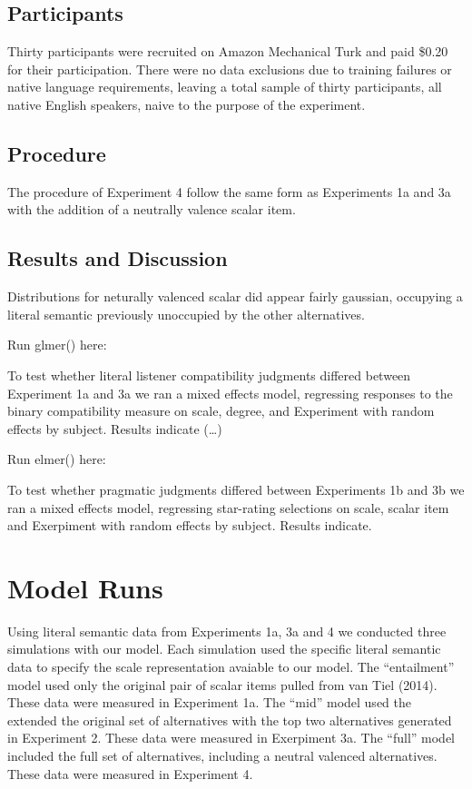 \documentclass[10pt, letterpaper]{article}
\begin{document}
\subsection{Participants}\label{participants-3}

Thirty participants were recruited on Amazon Mechanical Turk and paid
\$0.20 for their participation. There were no data exclusions due to
training failures or native language requirements, leaving a total
sample of thirty participants, all native English speakers, naive to the
purpose of the experiment.

\subsection{Procedure}\label{procedure-1}

The procedure of Experiment 4 follow the same form as Experiments 1a and
3a with the addition of a neutrally valence scalar item.

\subsection{Results and Discussion}\label{results-and-discussion-3}

Distributions for neturally valenced scalar did appear fairly gaussian,
occupying a literal semantic previously unoccupied by the other
alternatives.

Run glmer() here:

To test whether literal listener compatibility judgments differed
between Experiment 1a and 3a we ran a mixed effects model, regressing
responses to the binary compatibility measure on scale, degree, and
Experiment with random effects by subject. Results indicate (\ldots{})

Run elmer() here:

To test whether pragmatic judgments differed between Experiments 1b and
3b we ran a mixed effects model, regressing star-rating selections on
scale, scalar item and Exerpiment with random effects by subject.
Results indicate.

\section{Model Runs}\label{model-runs}

Using literal semantic data from Experiments 1a, 3a and 4 we conducted
three simulations with our model. Each simulation used the specific
literal semantic data to specify the scale representation avaiable to
our model. The ``entailment'' model used only the original pair of
scalar items pulled from van Tiel (2014). These data were measured in
Experiment 1a. The ``mid'' model used the extended the original set of
alternatives with the top two alternatives generated in Experiment 2.
These data were measured in Exerpiment 3a. The ``full'' model included
the full set of alternatives, including a neutral valenced alternatives.
These data were measured in Experiment 4.
\end{document}
